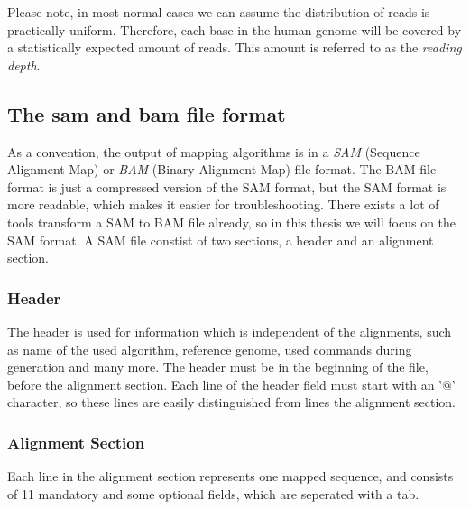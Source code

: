Please note, in most normal cases we can assume the distribution of reads is practically uniform. Therefore, each base in the human genome will be covered by a statistically expected amount of reads. This amount is referred to as the \emph{reading depth}.


\subsection{The sam and bam file format}

As a convention, the output of mapping algorithms is in a \emph{SAM} (Sequence Alignment Map) or \emph{BAM} (Binary Alignment Map) file format. The BAM file format is just a compressed version of the SAM format, but the SAM format is more readable, which makes it easier for troubleshooting. There exists a lot of tools transform a SAM to BAM file already, so in this thesis we will focus on the SAM format. A SAM file constist of two sections, a header and an alignment section. 


\subsubsection{Header}
The header is used for information which is independent of the alignments, such as name of the used algorithm, reference genome, used commands during generation and many more.
The header must be in the beginning of the file, before 
the alignment section. Each line of the header field must start with an '@' character, so these lines are easily distinguished from lines the alignment section.

\subsubsection{Alignment Section}
Each line in the alignment section represents one mapped sequence, and consists of 11 mandatory and some optional fields, which are seperated with a tab.

